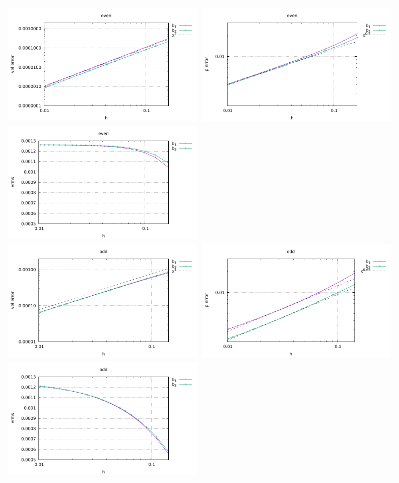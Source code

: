\begin{center}
\includegraphics[width=5cm]{python_codes/fieldstone_72/results/solcx/errors_v_even}
\includegraphics[width=5cm]{python_codes/fieldstone_72/results/solcx/errors_p_even}
\includegraphics[width=5cm]{python_codes/fieldstone_72/results/solcx/vrms_even}\\
\includegraphics[width=5cm]{python_codes/fieldstone_72/results/solcx/errors_v_odd}
\includegraphics[width=5cm]{python_codes/fieldstone_72/results/solcx/errors_p_odd}
\includegraphics[width=5cm]{python_codes/fieldstone_72/results/solcx/vrms_odd}
\end{center}

